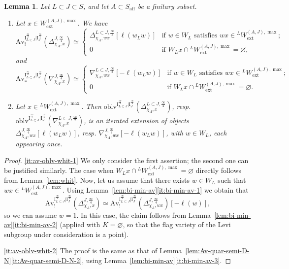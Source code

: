 \documentclass[11pt]{amsart}
\numberwithin{equation}{section}
\theoremstyle{plain}
\newtheorem{lem}[thm]{Lemma}
\theoremstyle{definition}
\newcommand{\I}{{\mathrm I}}
\newcommand{\semi}{{{\frac{\infty}{2}}}}
\newcommand{\quar}{{{\frac{\infty}{4}}}}
\newcommand{\oblv}{\mathrm{oblv}}
\newcommand{\Av}{\mathrm{Av}}
\newcommand{\ex}{\mathrm{ext}}
\newcommand{\af}{\mathrm{aff}}
\begin{document}
\begin{lem}
\label{lem:av-oblv-whit}
Let $L \subset J \subset S$, and let $A \subset S_\af$ be a finitary subset.
\begin{enumerate}
\item 
\label{it:av-oblv-whit-1}
Let $x\in W_\ex^{(A,J),\max}$. 
We have 
\[
\Av_!^{\I_{L \subset J}^{\semi}|\I_J^{\quar}}(\Delta^{J,\quar}_{\chi_A,x})\simeq
\begin{cases}
\Delta^{L \subset J,\semi}_{\chi_A, wx}[\ell(w_Lw)] & \text{if $w\in W_L$ satisfies $wx\in {}^LW_\ex^{(A,J),\max}$;} \\ 
0 & \text{if $W_L x \cap {}^LW_\ex^{(A,J),\max} = \varnothing$,}
\end{cases}
\]
and 
\[
\Av_*^{\I_{L \subset J}^{\semi}|\I_J^{\quar}}(\nabla^{J,\quar}_{\chi_A,x})\simeq
\begin{cases}
\nabla^{L \subset J,\semi}_{\chi_A, wx}[-\ell(w_Lw)] & \text{if $w\in W_L$ satisfies $wx\in {}^LW_\ex^{(A,J),\max}$;} \\ 
0 & \text{if $W_L x \cap {}^LW_\ex^{(A,J),\max} = \varnothing$.} 
\end{cases}
\]
\item 
\label{it:av-oblv-whit-2}
Let $x\in {}^L W_\ex^{(A,J),\max}$. 
Then $\oblv^{\I_{L \subset J}^{\semi}|\I_J^{\quar}}(\Delta^{L \subset J,\semi}_{\chi_A,x})$, resp. $\oblv^{\I_{L \subset J}^{\semi}|\I_J^{\quar}}(\nabla^{L \subset J,\semi}_{\chi_A,x})$, is an iterated extension of objects $\Delta^{J,\quar}_{\chi_A, wx}[\ell(w_Lw)]$, resp. $\nabla^{J,\quar}_{\chi_A,wx}[-\ell(w_Lw)]$, with $w\in W_L$, each appearing once. 
\end{enumerate}
\end{lem}

\begin{proof}
\eqref{it:av-oblv-whit-1}
We only consider the first assertion; the second one can be justified similarly.
The case when $W_L x \cap {}^L W_\ex^{(A,J),\max}=\varnothing$ directly follows from Lemma~\ref{lem:whit}. Now, let us assume that there exists $w\in W_L$ such that $wx\in {}^L W_\ex^{(A,J),\max}$. Using Lemma~\ref{lem:bi-min-av}\eqref{it:bi-min-av-1} we obtain that
\[
\Av_!^{\I_{L \subset J}^{\semi}|\I_J^{\quar}}(\Delta^{J,\quar}_{\chi_A,x}) \simeq \Av_!^{\I_{L \subset J}^{\semi}|\I_J^{\quar}}(\Delta^{J,\quar}_{\chi_A,wx})[-\ell(w)],
\]
so we can assume $w=1$. In this case, the claim follows from Lemma~\ref{lem:bi-min-av}\eqref{it:bi-min-av-2} (applied with $K=\varnothing$, so that the flag variety of the Levi subgroup under consideration is a point).

\eqref{it:av-oblv-whit-2}
The proof is the same as that of Lemma~\ref{lem:Av-quar-semi-D-N}\eqref{it:Av-quar-semi-D-N-2}, using
Lemma~\ref{lem:bi-min-av}\eqref{it:bi-min-av-3}.
\end{proof}
\end{document}
